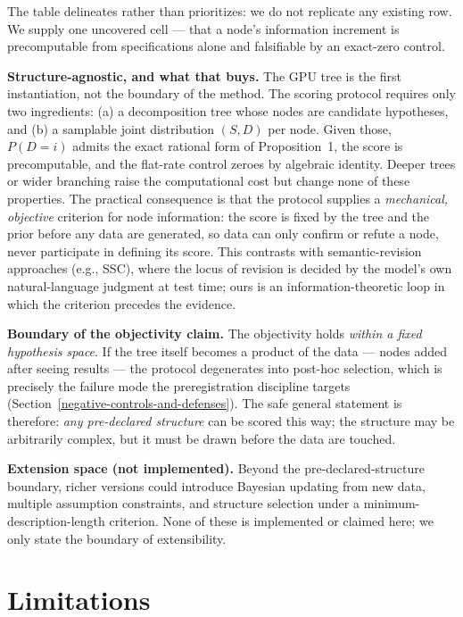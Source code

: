 \documentclass[10pt]{article}
\begin{document}
The table delineates rather than prioritizes: we do not replicate any existing row. We supply one uncovered cell --- that a node's information increment is precomputable from specifications alone and falsifiable by an exact-zero control.

\textbf{Structure-agnostic, and what that buys.} The GPU tree is the first instantiation, not the boundary of the method. The scoring protocol requires only two ingredients: (a) a decomposition tree whose nodes are candidate hypotheses, and (b) a samplable joint distribution $(S,D)$ per node. Given those, $P(D=i)$ admits the exact rational form of Proposition~1, the score is precomputable, and the flat-rate control zeroes by algebraic identity. Deeper trees or wider branching raise the computational cost but change none of these properties. The practical consequence is that the protocol supplies a \emph{mechanical, objective} criterion for node information: the score is fixed by the tree and the prior before any data are generated, so data can only confirm or refute a node, never participate in defining its score. This contrasts with semantic-revision approaches (e.g., SSC), where the locus of revision is decided by the model's own natural-language judgment at test time; ours is an information-theoretic loop in which the criterion precedes the evidence.

\textbf{Boundary of the objectivity claim.} The objectivity holds \emph{within a fixed hypothesis space}. If the tree itself becomes a product of the data --- nodes added after seeing results --- the protocol degenerates into post-hoc selection, which is precisely the failure mode the preregistration discipline targets (Section~\ref{negative-controls-and-defenses}). The safe general statement is therefore: \emph{any pre-declared structure} can be scored this way; the structure may be arbitrarily complex, but it must be drawn before the data are touched.

\textbf{Extension space (not implemented).} Beyond the pre-declared-structure boundary, richer versions could introduce Bayesian updating from new data, multiple assumption constraints, and structure selection under a minimum-description-length criterion. None of these is implemented or claimed here; we only state the boundary of extensibility.

\section{Limitations}\label{limitations}
\end{document}
